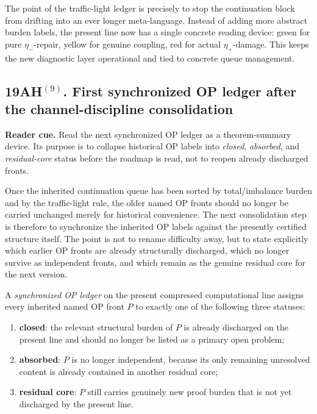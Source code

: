 \begin{remark}
The point of the traffic-light ledger is precisely to stop the continuation block from drifting into an ever longer meta-language. Instead of adding more abstract burden labels, the present line now has a single concrete reading device: green for pure \(\eta_-\)-repair, yellow for genuine coupling, red for actual \(\eta_+\)-damage. This keeps the new diagnostic layer operational and tied to concrete queue management.
\end{remark}

\subsection*{19AH$^{(9)}$. First synchronized OP ledger after the channel-discipline consolidation}
\noindent\textbf{Reader cue.} Read the next synchronized OP ledger as a theorem-summary device. Its purpose is to collapse historical OP labels into \emph{closed}, \emph{absorbed}, and \emph{residual-core} status before the roadmap is read, not to reopen already discharged fronts.

Once the inherited continuation queue has been sorted by total/imbalance burden and by the traffic-light rule, the older named OP fronts should no longer be carried unchanged merely for historical convenience. The next consolidation step is therefore to synchronize the inherited OP labels against the presently certified structure itself. The point is not to rename difficulty away, but to state explicitly which earlier OP fronts are already structurally discharged, which no longer survive as independent fronts, and which remain as the genuine residual core for the next version.

\begin{definition}
A \emph{synchronized OP ledger} on the present compressed computational line assigns every inherited named OP front \(P\) to exactly one of the following three statuses:
\begin{enumerate}[leftmargin=2em]
  \item \textbf{closed}: the relevant structural burden of \(P\) is already discharged on the present line and should no longer be listed as a primary open problem;
  \item \textbf{absorbed}: \(P\) is no longer independent, because its only remaining unresolved content is already contained in another residual core;
  \item \textbf{residual core}: \(P\) still carries genuinely new proof burden that is not yet discharged by the present line.
\end{enumerate}
\end{definition}

